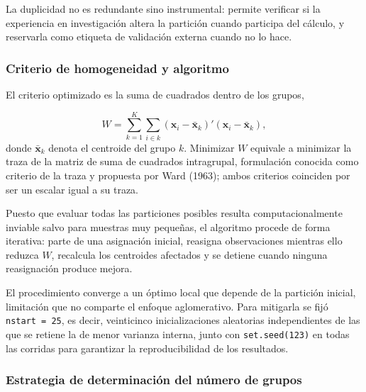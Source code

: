 \documentclass[
  10pt,
  a4paper]{article}
\begin{document}
La duplicidad no es redundante sino instrumental: permite verificar si la experiencia en investigación altera la partición cuando participa del cálculo, y reservarla como etiqueta de validación externa cuando no lo hace.

\subsubsection{Criterio de homogeneidad y algoritmo}\label{criterio-de-homogeneidad-y-algoritmo}

El criterio optimizado es la suma de cuadrados dentro de los grupos,

\[
W = \sum_{k=1}^{K} \sum_{i \in k}
\left( \mathbf{x}_{i} - \bar{\mathbf{x}}_{k} \right)'
\left( \mathbf{x}_{i} - \bar{\mathbf{x}}_{k} \right),
\]
donde \(\bar{\mathbf{x}}_{k}\) denota el centroide del grupo \(k\). Minimizar \(W\) equivale a minimizar la traza de la matriz de suma de cuadrados intragrupal, formulación conocida como criterio de la traza y propuesta por Ward (1963); ambos criterios coinciden por ser un escalar igual a su traza.

Puesto que evaluar todas las particiones posibles resulta computacionalmente inviable salvo para muestras muy pequeñas, el algoritmo procede de forma iterativa: parte de una asignación inicial, reasigna observaciones mientras ello reduzca \(W\), recalcula los centroides afectados y se detiene cuando ninguna reasignación produce mejora.

El procedimiento converge a un óptimo local que depende de la partición inicial, limitación que no comparte el enfoque aglomerativo. Para mitigarla se fijó \texttt{nstart\ =\ 25}, es decir, veinticinco inicializaciones aleatorias independientes de las que se retiene la de menor varianza interna, junto con \texttt{set.seed(123)} en todas las corridas para garantizar la reproducibilidad de los resultados.

\subsubsection{Estrategia de determinación del número de grupos}\label{estrategia-de-determinaciuxf3n-del-nuxfamero-de-grupos}
\end{document}

